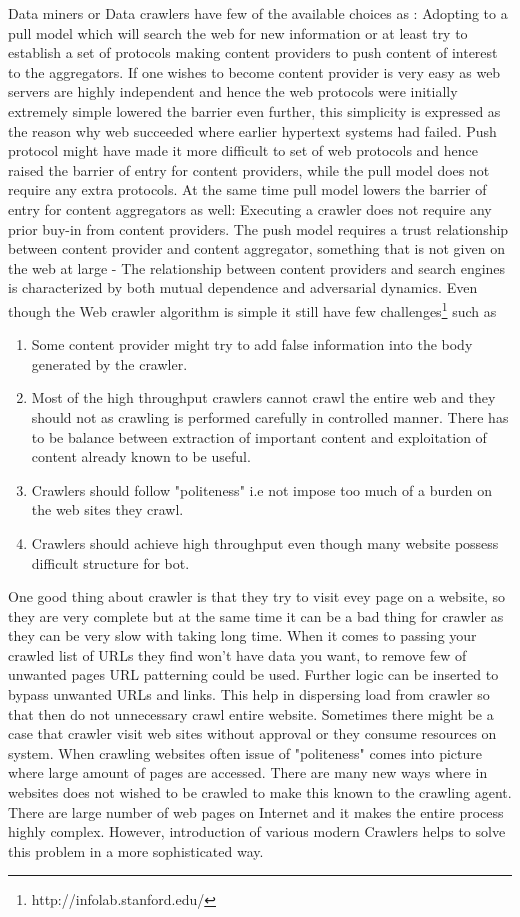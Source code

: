 \documentclass[article,type=msc,colorback,accentcolor=tud9c,twoside,11pt]{tudthesis}
\begin{document}
	Data miners or Data crawlers have few of the available choices as : Adopting to a pull model which will search the web for new information or at least try to establish a set of protocols making content providers to push content of interest to the aggregators. If one wishes to become content provider is very easy as web servers are highly independent and hence the web protocols were initially extremely simple lowered the barrier even further, this simplicity is expressed as the reason why web succeeded where earlier hypertext systems had failed. Push protocol might have made it more difficult to set of web protocols and hence raised the barrier of entry for content providers, while the pull model does not require any extra protocols. At the same time pull model lowers the barrier of entry for content aggregators as well: Executing a crawler does not require any prior buy-in from content providers. The push model requires a trust relationship between content provider and content aggregator, something that is not given on the web at large - The relationship between content providers and search engines is characterized by both mutual dependence and adversarial dynamics.
	Even though the Web crawler algorithm is simple it still have few challenges\footnote{http://infolab.stanford.edu/} such as
	\begin{enumerate}
		\item Some content provider might try to add false information into the body generated by the crawler.
		\item Most of the high throughput crawlers cannot crawl the entire web and they should not as crawling is performed carefully in controlled manner. There has to be balance between extraction of important content and exploitation of content already known to be useful.
		\item Crawlers should follow "politeness" i.e not impose too much of a burden on the web sites they crawl.
		\item Crawlers should achieve high throughput even though many website possess difficult structure for bot.
	\end{enumerate}
	
	One good thing about crawler is that they try to visit evey page on a website, so they are very complete but at the same time it can be a bad thing for crawler as they can be very slow with taking long time. When it comes to passing your crawled list of URLs they find won't have data you want, to remove few of unwanted pages URL patterning could be used. Further logic can be inserted to bypass unwanted URLs and links. This help in dispersing load from crawler so that then do not unnecessary crawl entire website. Sometimes there might be a case that crawler visit web sites without approval or they consume resources on system. When crawling websites often issue of "politeness" comes into picture where large amount of pages are accessed. There are many new ways where in websites does not wished to be crawled to make this known to the crawling agent. There are large number of web pages on Internet and it makes the entire process highly complex. However, introduction of various modern Crawlers helps to solve this problem in a more sophisticated way. 
	
\end{document}
